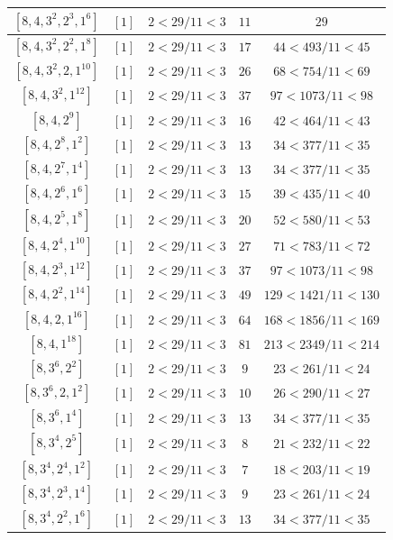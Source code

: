 \documentclass{article}%
\begin{document}
\begin{center}
\begin{longtable}{||c|c|c|c|c||}
$[8, 4, 3^{2}, 2^{3}, 1^{6}]$ & $[1]$ & $2 < 29/11 < 3$ & $11$ & $29$ \\ \hline 
$[8, 4, 3^{2}, 2^{2}, 1^{8}]$ & $[1]$ & $2 < 29/11 < 3$ & $17$ & $44 < 493/11 < 45$ \\ \hline 
$[8, 4, 3^{2}, 2, 1^{10}]$ & $[1]$ & $2 < 29/11 < 3$ & $26$ & $68 < 754/11 < 69$ \\ \hline 
$[8, 4, 3^{2}, 1^{12}]$ & $[1]$ & $2 < 29/11 < 3$ & $37$ & $97 < 1073/11 < 98$ \\ \hline 
$[8, 4, 2^{9}]$ & $[1]$ & $2 < 29/11 < 3$ & $16$ & $42 < 464/11 < 43$ \\ \hline 
$[8, 4, 2^{8}, 1^{2}]$ & $[1]$ & $2 < 29/11 < 3$ & $13$ & $34 < 377/11 < 35$ \\ \hline 
$[8, 4, 2^{7}, 1^{4}]$ & $[1]$ & $2 < 29/11 < 3$ & $13$ & $34 < 377/11 < 35$ \\ \hline 
$[8, 4, 2^{6}, 1^{6}]$ & $[1]$ & $2 < 29/11 < 3$ & $15$ & $39 < 435/11 < 40$ \\ \hline 
$[8, 4, 2^{5}, 1^{8}]$ & $[1]$ & $2 < 29/11 < 3$ & $20$ & $52 < 580/11 < 53$ \\ \hline 
$[8, 4, 2^{4}, 1^{10}]$ & $[1]$ & $2 < 29/11 < 3$ & $27$ & $71 < 783/11 < 72$ \\ \hline 
$[8, 4, 2^{3}, 1^{12}]$ & $[1]$ & $2 < 29/11 < 3$ & $37$ & $97 < 1073/11 < 98$ \\ \hline 
$[8, 4, 2^{2}, 1^{14}]$ & $[1]$ & $2 < 29/11 < 3$ & $49$ & $129 < 1421/11 < 130$ \\ \hline 
$[8, 4, 2, 1^{16}]$ & $[1]$ & $2 < 29/11 < 3$ & $64$ & $168 < 1856/11 < 169$ \\ \hline 
$[8, 4, 1^{18}]$ & $[1]$ & $2 < 29/11 < 3$ & $81$ & $213 < 2349/11 < 214$ \\ \hline 
$[8, 3^{6}, 2^{2}]$ & $[1]$ & $2 < 29/11 < 3$ & $9$ & $23 < 261/11 < 24$ \\ \hline 
$[8, 3^{6}, 2, 1^{2}]$ & $[1]$ & $2 < 29/11 < 3$ & $10$ & $26 < 290/11 < 27$ \\ \hline 
$[8, 3^{6}, 1^{4}]$ & $[1]$ & $2 < 29/11 < 3$ & $13$ & $34 < 377/11 < 35$ \\ \hline 
$[8, 3^{4}, 2^{5}]$ & $[1]$ & $2 < 29/11 < 3$ & $8$ & $21 < 232/11 < 22$ \\ \hline 
$[8, 3^{4}, 2^{4}, 1^{2}]$ & $[1]$ & $2 < 29/11 < 3$ & $7$ & $18 < 203/11 < 19$ \\ \hline 
$[8, 3^{4}, 2^{3}, 1^{4}]$ & $[1]$ & $2 < 29/11 < 3$ & $9$ & $23 < 261/11 < 24$ \\ \hline 
$[8, 3^{4}, 2^{2}, 1^{6}]$ & $[1]$ & $2 < 29/11 < 3$ & $13$ & $34 < 377/11 < 35$ \\ \hline 

\end{longtable}
\end{center}
\end{document}
